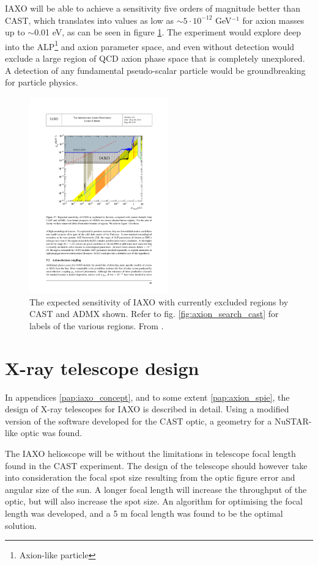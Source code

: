 IAXO will be able to achieve a sensitivity five orders of magnitude better than CAST, which translates into \gay values as low as $\sim5\cdot10^{-12}$ GeV$^{-1}$ for axion masses up to $\sim$0.01 eV, as can be seen in figure \ref{fig:iaxo_search}. The experiment would explore deep into the ALP\footnote{Axion-like particle} and axion parameter space, and even without detection would exclude a large region of QCD axion phase space that is completely unexplored. A detection of any fundamental pseudo-scalar particle would be groundbreaking for particle physics.

\begin{figure}[!h]
  \center
\includegraphics[height=8.5cm]{figures/iaxo/iaxo_axion_search.pdf}
\caption{\footnotesize The expected sensitivity of IAXO with currently excluded regions by CAST and ADMX\cite{Asztalos:2001ty} shown. Refer to fig. \ref{fig:axion_search_cast} for labels of the various regions. From \cite{Irastorza:2013uu}.}\label{fig:iaxo_search}
\end{figure}

\section{X-ray telescope design}
In appendices \ref{pap:iaxo_concept}, and to some extent \ref{pap:axion_spie}, the design of X-ray telescopes for IAXO is described in detail. Using a modified version of the software developed for the CAST optic, a geometry for a NuSTAR-like optic was found.

The IAXO helioscope will be without the limitations in telescope focal length found in the CAST experiment. The design of the telescope should however take into consideration the focal spot size resulting from the optic figure error and angular size of the sun. A longer focal length will increase the throughput of the optic, but will also increase the spot size. An algorithm for optimising the focal length was developed, and a 5 m focal length was found to be the optimal solution.

